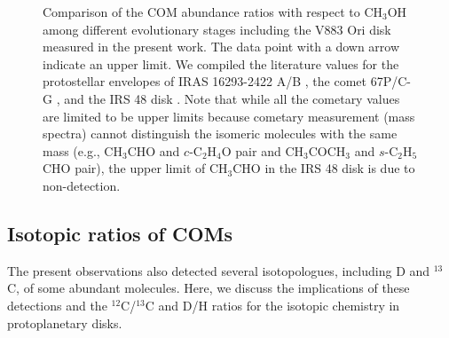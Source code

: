 \documentclass[linenumbers, twocolumn, twocolappendix, astrosymb, times]{aastex631}
\newcommand{\methanol}{CH$_3$OH\xspace}
\newcommand{\acetaldehyde}{CH$_3$CHO\xspace}
\newcommand{\methylformate}{CH$_3$OCHO\xspace}
\newcommand{\acetone}{CH$_3$COCH$_3$\xspace}
\newcommand{\ethyleneoxide}{$c$-C$_2$H$_4$O\xspace}
\newcommand{\propenal}{$t$-C$_2$H$_3$CHO\xspace}
\newcommand{\propanal}{$s$-C$_2$H$_5$CHO\xspace}
\begin{document}






\begin{figure}
\caption{Comparison of the COM abundance ratios with respect to \methanol among different evolutionary stages including the V883 Ori disk measured in the present work. The data point with a down arrow indicate an upper limit. We compiled the literature values for the protostellar envelopes of IRAS 16293-2422 A/B \citep{Lykke2017, Jorgensen2018, Manigand2020, Manigand2021}, the comet 67P/C-G \citep{Rubin2019, Schuhmann2019}, and the IRS 48 disk \citep{Brunken2022}. Note that while all the cometary values are limited to be upper limits because cometary measurement (mass spectra) cannot distinguish the isomeric molecules with the same mass (e.g., \acetaldehyde and \ethyleneoxide pair and \acetone and \propanal pair), the upper limit of \acetaldehyde in the IRS 48 disk is due to non-detection.}
\label{fig:ratio_comparison}
\end{figure}



\subsection{Isotopic ratios of COMs}
The present observations also detected several isotopologues, including D and $^{13}$C, of some abundant molecules. Here, we discuss the implications of these detections and the $^{12}$C/$^{13}$C and D/H ratios for the isotopic chemistry in protoplanetary disks. 
\end{document}

